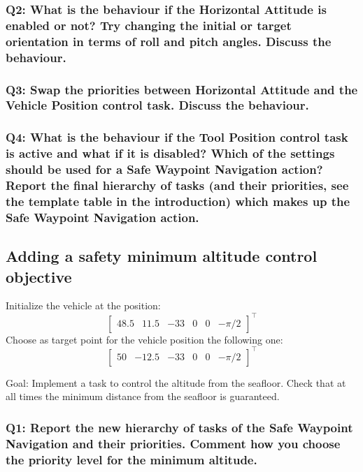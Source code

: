 \documentclass{article}
\begin{document}
\subsubsection{Q2: What is the behaviour if the Horizontal Attitude is enabled or not? Try changing the initial or target orientation in terms of roll and pitch angles. Discuss the behaviour.}


\subsubsection{Q3: Swap the priorities between Horizontal Attitude and the Vehicle Position control task. Discuss the behaviour.}

\subsubsection{Q4: What is the behaviour if the Tool Position control task is active and what if it is disabled? Which of the settings should be used for a Safe Waypoint Navigation action? Report the final hierarchy of tasks (and their priorities, see the template table in the introduction) which makes up the Safe Waypoint Navigation action.}


\subsection{Adding a safety minimum altitude control objective}
Initialize the vehicle at the position:
\begin{displaymath}
\begin{bmatrix} 48.5 & 11.5 & -33 & 0 & 0 &-\pi/2\end{bmatrix}^\top
\end{displaymath}
Choose as target point for the vehicle position the following one:
\begin{displaymath}
\begin{bmatrix} 50 & -12.5 & -33 & 0 & 0 & -\pi/2 \end{bmatrix}^\top
\end{displaymath}

Goal: Implement a task to control the altitude from the seafloor. Check that at all times the minimum distance from the seafloor is guaranteed.


\subsubsection{Q1: Report the new hierarchy of tasks of the Safe Waypoint Navigation and their priorities. Comment how you choose the priority level for the minimum altitude.}
\end{document}

